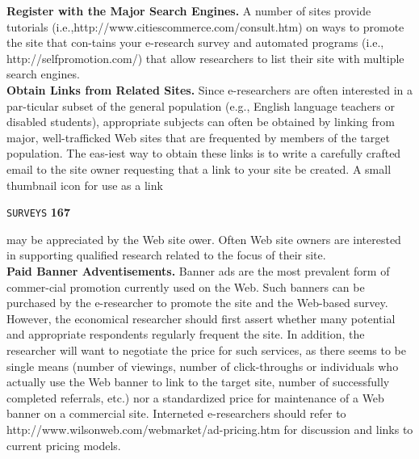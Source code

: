 \documentclass[a4,12pt]{book}
\begin{document}
\vspace*{0.5cm}

\textbf{Register with the Major Search Engines.}  \hspace*{0.2cm} A number of sites provide tutorials (i.e.,http://www.citiescommerce.com/consult.htm) on ways to promote the site that con-tains your e-research survey and automated programs (i.e., http://selfpromotion.com/) that allow researchers to list their site with multiple search engines.\\

 \vspace*{0.4cm}
\textbf{Obtain Links from Related Sites.} \hspace*{0.2cm} Since e-researchers are often interested in a par-ticular subset of the general population (e.g., English language teachers or disabled students), appropriate subjects can often be obtained by linking from major, well-trafficked Web sites that are frequented by members of the target population. The eas-iest way to obtain these links is to write a carefully crafted email to the site owner requesting that a link to your site be created. A small thumbnail icon for use as a link\\

\newpage

\begin{flushright}
 \texttt{SURVEYS} \hspace*{1cm} \textbf{167}
\end{flushright}

\vspace*{0.5cm}
may be appreciated by the Web site ower. Often Web site owners are interested in supporting qualified research related to the focus of their site.\\

 \vspace*{0.4cm}
 \textbf{Paid Banner Adventisements. }  \hspace*{0.2cm} Banner ads are the most prevalent form of commer-cial promotion currently used on the Web. Such banners can be purchased by the e-researcher to promote the site and the Web-based survey. However, the economical researcher should first assert whether many potential and appropriate respondents regularly frequent the site. In addition, the researcher will want to negotiate the price for such services, as there seems to be single means (number of viewings, number of click-throughs or individuals who actually use the Web banner to link to the target site, number of successfully completed referrals, etc.) nor a standardized price for maintenance of a Web banner on a commercial site. Interneted e-researchers should refer to http://www.wilsonweb.com/webmarket/ad-pricing.htm for discussion and links to current pricing models.\\
\end{document}
